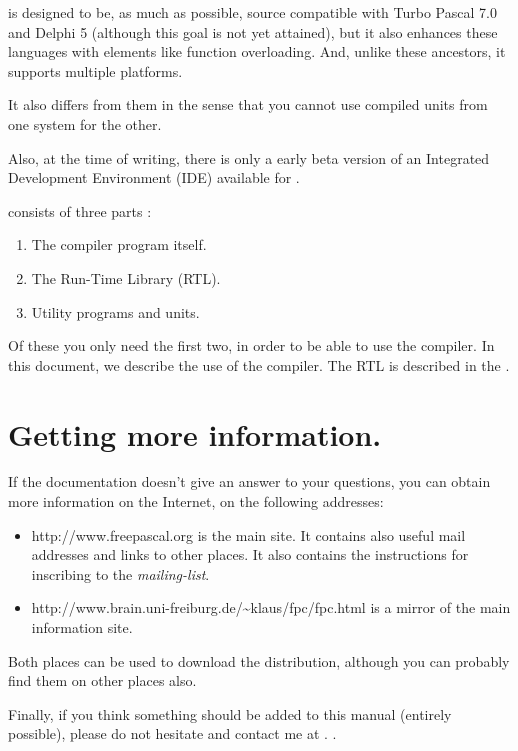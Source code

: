 \documentclass{book}
\begin{document}
\fpc is designed to be, as much as possible, source compatible with
Turbo Pascal 7.0 and Delphi 5 (although this goal is not yet attained),
but it also enhances these languages with elements like function overloading.
And, unlike these ancestors, it supports multiple platforms.

It also differs from them in the sense that you cannot use compiled units
from one system for the other.

Also, at the time of writing, there is only a early beta version of an
Integrated Development Environment (IDE) available for \fpc.

\fpc consists of three parts :
\begin{enumerate}
\item The compiler program itself.
\item The Run-Time Library (RTL).
\item Utility programs and units.
\end{enumerate}

Of these you only need the first two, in order to be able to use the compiler.
In this document, we describe the use of the compiler. The RTL is described in the
.

\section{Getting more information.}
If the documentation doesn't give an answer to your questions,
you can obtain more information on the Internet, on the following addresses:
\begin{itemize}
\item
{}
{http://www.freepascal.org} is the main
site. It contains also useful mail addresses and
links to other places.
It also contains the instructions for inscribing to the
\textit{mailing-list}.

\item
{}
{http://www.brain.uni-freiburg.de/\~{}klaus/fpc/fpc.html} is a mirror
of the main \fpc information site.
\end{itemize}
Both places can be used to download the \fpc distribution, although you can
probably find them on other places also.

Finally, if you think something should be added to this manual
(entirely possible), please do not hesitate and contact me at
.
.
\end{document}
